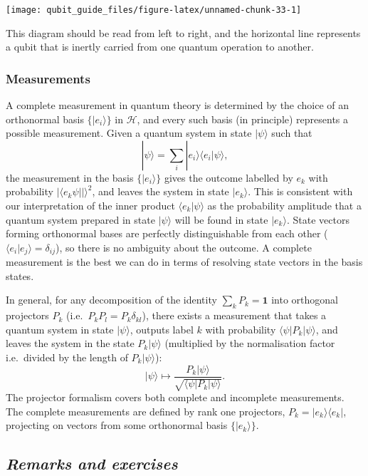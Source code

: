 \documentclass[fleqn]{article}
\begin{document}
\begin{center}\texttt{[image: qubit\_guide\_files/figure-latex/unnamed-chunk-33-1]} \end{center}

This diagram should be read from left to right, and the horizontal line represents a qubit that is inertly carried from one quantum operation to another.

\hypertarget{measurements-1}{%
\subsubsection{Measurements}\label{measurements-1}}

A complete measurement in quantum theory is determined by the choice of an orthonormal basis \(\{|e_i\rangle\}\) in \(\mathcal{H}\), and every such basis (in principle) represents a possible measurement.
Given a quantum system in state \(|\psi\rangle\) such that
\[
  |\psi\rangle = \sum_i |e_i\rangle\langle e_i|\psi\rangle,
\]
the measurement in the basis \(\{|e_i\rangle\}\) gives the outcome labelled by \(e_k\) with probability \(|\langle e_k\psi||\rangle^2\), and leaves the system in state \(|e_k\rangle\).
This is consistent with our interpretation of the inner product \(\langle e_k|\psi\rangle\) as the probability amplitude that a quantum system prepared in state \(|\psi\rangle\) will be found in state \(|e_k\rangle\).
State vectors forming orthonormal bases are perfectly distinguishable from each other (\(\langle e_i|e_j\rangle=\delta_{ij}\)), so there is no ambiguity about the outcome.
A complete measurement is the best we can do in terms of resolving state vectors in the basis states.

In general, for any decomposition of the identity \(\sum_k P_k=\mathbf{1}\) into orthogonal projectors \(P_k\) (i.e.~\(P_kP_l = P_k\delta_{kl}\)), there exists a measurement that takes a quantum system in state \(|\psi\rangle\), outputs label \(k\) with probability \(\langle\psi|P_k|\psi\rangle\), and leaves the system in the state \(P_k|\psi\rangle\) (multiplied by the normalisation factor i.e.~divided by the length of \(P_k|\psi\rangle\)):
\[
  |\psi\rangle
  \mapsto
  \frac{P_k|\psi\rangle}{\sqrt{\langle\psi|P_k|\psi\rangle}}.
\]
The projector formalism covers both complete and incomplete measurements.
The complete measurements are defined by rank one projectors, \(P_k=|e_k\rangle\langle e_k|\), projecting on vectors from some orthonormal basis \(\{|e_k\rangle\}\).

\hypertarget{remarks-and-exercises-4}{%
\subsection{\texorpdfstring{\emph{Remarks and exercises}}{Remarks and exercises}}\label{remarks-and-exercises-4}}
\end{document}

